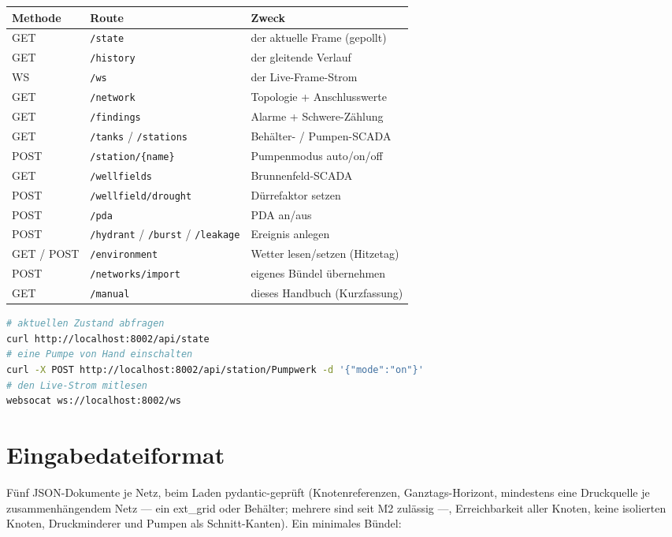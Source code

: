 \documentclass[11pt,a4paper,parskip=half]{scrreprt}
\newcommand{\api}[1]{\texttt{#1}}               %
\begin{document}
\begin{center}
\small
\begin{tabularx}{\linewidth}{@{}llX@{}}
\toprule
Methode & Route & Zweck \\
\midrule
GET  & \api{/state}      & der aktuelle Frame (gepollt) \\
GET  & \api{/history}    & der gleitende Verlauf \\
WS   & \api{/ws}         & der Live-Frame-Strom \\
GET  & \api{/network}    & Topologie + Anschlusswerte \\
GET  & \api{/findings}   & Alarme + Schwere-Zählung \\
GET  & \api{/tanks} / \api{/stations} & Behälter- / Pumpen-SCADA \\
POST & \api{/station/\{name\}} & Pumpenmodus auto/on/off \\
GET  & \api{/wellfields} & Brunnenfeld-SCADA \\
POST & \api{/wellfield/drought} & Dürrefaktor setzen \\
POST & \api{/pda}        & PDA an/aus \\
POST & \api{/hydrant} / \api{/burst} / \api{/leakage} & Ereignis anlegen \\
GET  / POST & \api{/environment} & Wetter lesen/setzen (Hitzetag) \\
POST & \api{/networks/import} & eigenes Bündel übernehmen \\
GET  & \api{/manual}     & dieses Handbuch (Kurzfassung) \\
\bottomrule
\end{tabularx}
\end{center}

\begin{lstlisting}[language=bash]
# aktuellen Zustand abfragen
curl http://localhost:8002/api/state
# eine Pumpe von Hand einschalten
curl -X POST http://localhost:8002/api/station/Pumpwerk -d '{"mode":"on"}'
# den Live-Strom mitlesen
websocat ws://localhost:8002/ws
\end{lstlisting}

\chapter{Eingabedateiformat}
\label{app:dateiformat}

Fünf JSON-Dokumente je Netz, beim Laden pydantic-geprüft (Knotenreferenzen,
Ganztags-Horizont, mindestens eine Druckquelle je zusammenhängendem Netz — ein
ext\_grid oder Behälter; mehrere sind seit M2 zulässig —, Erreichbarkeit aller
Knoten, keine isolierten Knoten, Druckminderer und Pumpen als Schnitt-Kanten).
Ein minimales Bündel:
\end{document}

